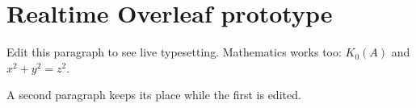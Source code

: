 \documentclass{article}
\begin{document}
\section{Realtime Overleaf prototype}
Edit this paragraph to see live typesetting. Mathematics works too: $K_0(A)$ and $x^2+y^2=z^2$.

A second paragraph keeps its place while the first is edited.
\end{document}

